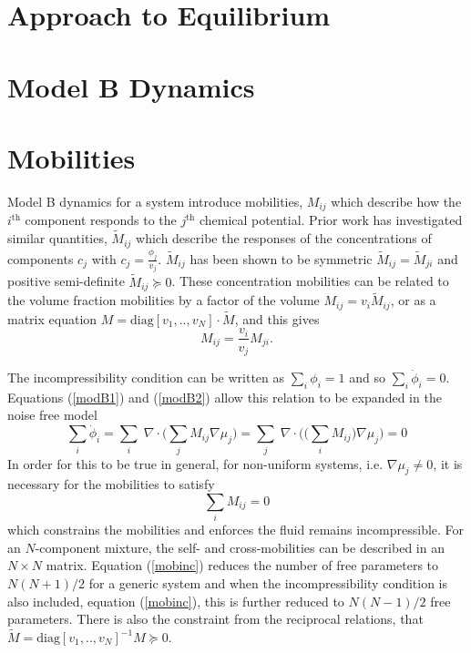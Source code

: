 \section{Approach to Equilibrium}

\section{Model B Dynamics}

\section{Mobilities}

Model B dynamics for a system introduce mobilities, $M_{ij}$ which describe how the $i^{\text{th}}$ component responds to the $j^{\text{th}}$ chemical potential. Prior work has investigated similar quantities, $\widetilde{M}_{ij}$ which describe the responses of the concentrations of components $c_j$ with $c_j = \frac{\phi_j}{v_j}$. $\widetilde{M}_{ij}$ has been shown to be symmetric $\widetilde{M}_{ij} = \widetilde{M}_{ji}$ and positive semi-definite $\widetilde{M}_{ij} \succcurlyeq 0$\cite{onsager_reciprocal_1931}. These concentration mobilities can be related to the volume fraction mobilities by a factor of the volume ${M}_{ij} = v_i\widetilde{M}_{ij}$, or as a matrix equation $M = \text{diag}[v_1, .., v_N]\cdot\widetilde{M}$, and this gives
\begin{equation}
    {M}_{ij} = \frac{v_i}{v_j}{M}_{ji}.
    \label{mobsym}
\end{equation}

The incompressibility condition can be written as $\sum_i\phi_i = 1$ and so $\sum_i\dot{\phi}_i = 0$. Equations (\ref{modB1}) and (\ref{modB2}) allow this relation to be expanded in the noise free model
\begin{equation}
    \sum_i\dot{\phi}_i = \sum_i\;\nabla\cdot\bigg(\sum_j M_{ij}\nabla\mu_j\bigg) = \sum_j\;\nabla\cdot\bigg(\big(\sum_i M_{ij}\big)\nabla\mu_j\bigg) = 0
\end{equation}
In order for this to be true in general, for non-uniform systems, i.e. $\nabla\mu_j \neq 0$, it is necessary for the mobilities to satisfy
\begin{equation}
    \sum_i M_{ij} = 0
    \label{mobinc}
\end{equation}
which constrains the mobilities and enforces the fluid remains incompressible. For an $N$-component mixture, the self- and cross-mobilities can be described in an $N\times N$ matrix. Equation (\ref{mobinc}) reduces the number of free parameters to $N(N+1)/2$ for a generic system and when the incompressibility condition is also included, equation (\ref{mobinc}), this is further reduced to $N(N-1)/2$ free parameters. There is also the constraint from the reciprocal relations, that $\widetilde{M} = \text{diag}[v_1, .., v_N]^{-1}M \succcurlyeq 0$.

